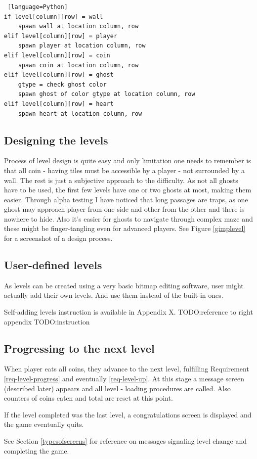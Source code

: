\documentclass[11pt,a4paper]{report}
\newcommand{\dsubsection}[1]{\FloatBarrier \subsection{#1}}
\begin{document}
				\begin{lstlisting} [language=Python]
if level[column][row] = wall
	spawn wall at location column, row
elif level[column][row] = player
	spawn player at location column, row
elif level[column][row] = coin
	spawn coin at location column, row
elif level[column][row] = ghost
	gtype = check ghost color
	spawn ghost of color gtype at location column, row
elif level[column][row] = heart
	spawn heart at location column, row
				\end{lstlisting}
			\dsubsection{Designing the levels}
				Process of level design is quite easy and only limitation one needs to remember is that all coin - having tiles must be accessible by a player - not surrounded by a wall. The rest is just a subjective approach to the difficulty. As not all ghosts have to be used, the first few levels have one or two ghosts at most, making them easier. Through alpha testing I have noticed that long passages are traps, as one ghost may approach player from one side and other from the other and there is nowhere to hide. Also it's easier for ghosts to navigate through complex maze and these might be finger-tangling even for advanced players.
				See Figure \ref{gimplevel} for a screenshot of a design process.
			\dsubsection{User-defined levels}
				As levels can be created using a very basic bitmap editing software, user might actually add their own levels. And use them instead of the built-in ones.
				
				Self-adding levels instruction is available in Appendix X.
				TODO:reference to right appendix
				TODO:instruction
			\dsubsection{Progressing to the next level}
				When player eats all coins, they advance to the next level, fulfilling Requirement \ref{req-level-progress} and eventually \ref{req-level-up}. At this stage a message screen (described later) appears and all level - loading procedures are called. Also counters of coins eaten and total are reset at this point.
				
				If the level completed was the last level, a congratulations screen is displayed and the game eventually quits.
				
				See Section \ref{typesofscreens} for reference on messages signaling level change and completing the game.
\end{document}
